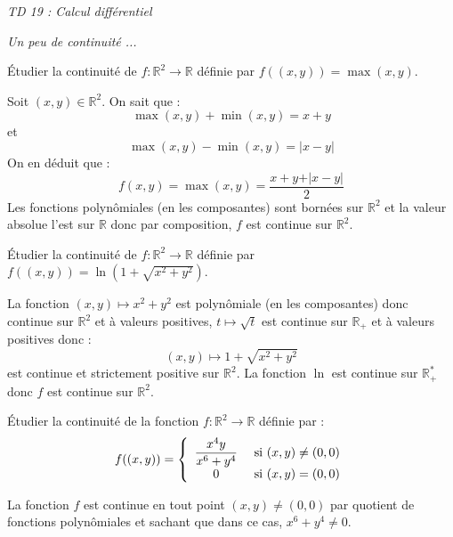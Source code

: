 \documentclass[a4paper,10pt]{report}
\begin{document}
\everymath{\displaystyle}

\begin{center}
\textit{{ {\huge TD 19 : Calcul différentiel}}}
\end{center}

\medskip

\medskip

\begin{center}
\textit{{ {\large Un peu de continuité ...}}}
\end{center}

\medskip


\begin{Exa} Étudier la continuité de $f : \mathbb{R}^2 \rightarrow \mathbb{R}$ définie par $ f((x,y))=  \max(x,y)$.
\end{Exa}

\corr Soit $(x,y) \in \mathbb{R}^2$. On sait que :
$$ \max(x,y)+ \min(x,y) = x+y$$
et 
$$ \max(x,y)-\min(x,y) = \vert x-y \vert$$
On en déduit que :
$$ f(x,y)= \max(x,y) = \dfrac{x+y+ \vert x-y \vert}{2}$$
Les fonctions polynômiales (en les composantes) sont bornées sur $\mathbb{R}^2$ et la valeur absolue l'est sur $\mathbb{R}$ donc par composition, $f$ est continue sur $\mathbb{R}^2$.

\begin{Exa} Étudier la continuité de $f : \mathbb{R}^2 \rightarrow \mathbb{R}$ définie par $f((x,y))= \ln(1 + \sqrt{x^2+y^2})$.
\end{Exa}

\corr La fonction $(x,y) \mapsto x^2+y^2$ est polynômiale (en les composantes) donc continue sur $\mathbb{R}^2$ et à valeurs positives, $t \mapsto \sqrt{t}$ est continue sur $\mathbb{R}_+$ et à valeurs positives donc :
$$ (x,y) \mapsto 1+ \sqrt{x^2+y^2}$$
est continue et strictement positive sur $\mathbb{R}^2$. La fonction $\ln$ est continue sur $\mathbb{R}_+^{*}$ donc $f$ est continue sur $\mathbb{R}^2$.

\begin{Exa} Étudier la continuité de la fonction $f : \mathbb{R}^2 \rightarrow \mathbb{R}$ définie par :
$$ f((x,y)) = \left\lbrace \begin{array}{cl}
\dfrac{x^4 y}{x^6+y^4} & \hbox{ si } (x,y) \neq (0,0) \\
0 & \hbox{ si } (x,y)=(0,0) \\
\end{array}\right.$$
\end{Exa}

\corr La fonction $f$ est continue en tout point $(x,y) \neq (0,0)$ par quotient de fonctions polynômiales et sachant que dans ce cas, $x^6+y^4 \neq 0$. 
\end{document}
